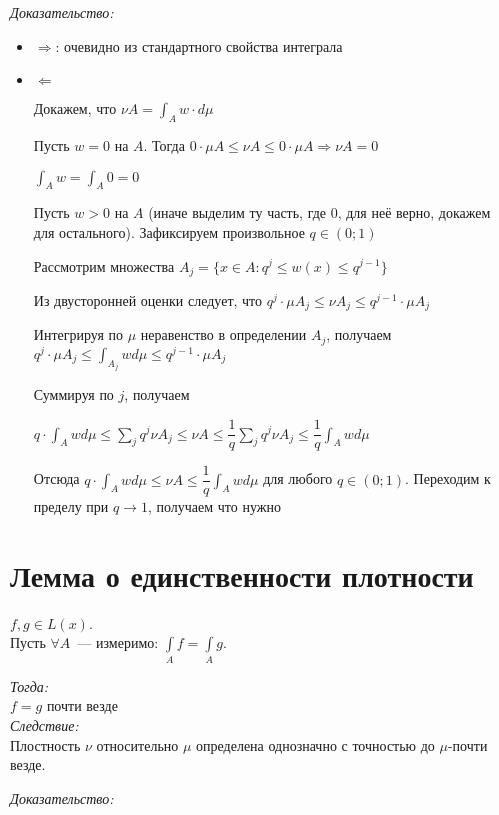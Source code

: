 \documentclass[paper=a4, fontsize=17pt]{article}
\begin{document}
	\emph{Доказательство:}
	 	\begin{itemize}
	 		\item $\Rightarrow$: очевидно из стандартного свойства интеграла
	 		\item $\Leftarrow$\par
	 		Докажем, что $\nu A = \int_A w \cdot d \mu$
	 		
	 		Пусть $w = 0$ на $A$. Тогда $0 \cdot \mu A \leqslant \nu A \leqslant 0 \cdot \mu A \Rightarrow \nu A = 0$
	 		
	 		$\int_A w = \int_A 0 = 0$
	 		
	 		Пусть $w > 0$ на $A$ (иначе выделим ту часть, где 0, для неё верно, докажем для остального). Зафиксируем произвольное $q \in  (0; 1)$
	 		
	 		Рассмотрим множества $A_j = \{x \in A: q^j \leqslant w(x) \leqslant q^{j - 1}\}$
	 		
	 		Из двусторонней оценки следует, что $q^j \cdot \mu A_j \leqslant \nu A_j \leqslant q^{j - 1} \cdot \mu A_j$
	
			Интегрируя по $\mu$ неравенство в определении $A_j$, получаем \newline $q^j \cdot \mu A_j \leqslant \int_{A_j} w d \mu \leqslant q^{j - 1} \cdot \mu A_j$
			
			Суммируя по $j$, получаем
			
			$q \cdot \int_A w d \mu \leqslant \sum\limits_{j} q^j \nu A_j \leqslant \nu A \leqslant \dfrac{1}{q} \sum\limits_{j} q^j \nu A_j \leqslant \dfrac{1}{q} \int_A w d \mu$
			
			Отсюда $q \cdot \int_A w d \mu \leqslant \nu A \leqslant \dfrac{1}{q} \int_A w d \mu$ для любого $q \in (0; 1)$. Переходим к пределу при $q \rightarrow 1$, получаем что нужно
	 	\end{itemize}

\section{Лемма о единственности плотности}
	$f, g \in L(x)$. \\
	Пусть $\forall A$~--- измеримо: $\int\limits_A f = \int\limits_A g$.

	\emph{Тогда: } \\
		$f = g$ почти везде \\
	\emph{Следствие: } \\
		Плостность $\nu$ относительно $\mu$ определена однозначно с точностью до $\mu$-почти везде.

	\emph{Доказательство: }
\end{document}
